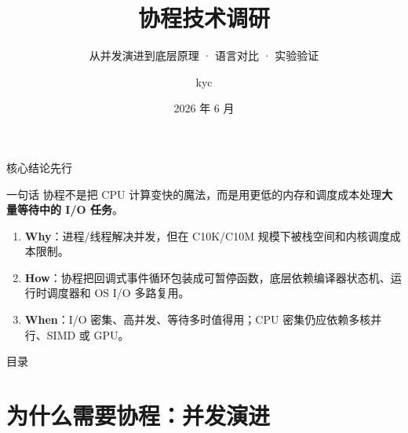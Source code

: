 \documentclass[aspectratio=169, 10pt]{beamer}
\title[协程技术调研]{协程技术调研}
\subtitle{从并发演进到底层原理 · 语言对比 · 实验验证}
\author[kyc]{kyc}
\institute{计算机学院}
\date{2026 年 6 月}
\begin{document}
\begin{frame}
  \titlepage
\end{frame}

\begin{frame}{核心结论先行}
  \begin{block}{一句话}
    协程不是把 CPU 计算变快的魔法，而是用更低的内存和调度成本处理\textbf{大量等待中的 I/O 任务}。
  \end{block}

  \begin{enumerate}
    \item \textbf{Why}：进程/线程解决并发，但在 C10K/C10M 规模下被栈空间和内核调度成本限制。
    \item \textbf{How}：协程把回调式事件循环包装成可暂停函数，底层依赖编译器状态机、运行时调度器和 OS I/O 多路复用。
    \item \textbf{When}：I/O 密集、高并发、等待多时值得用；CPU 密集仍应依赖多核并行、SIMD 或 GPU。
  \end{enumerate}
\end{frame}

\begin{frame}{目录}
  \tableofcontents
\end{frame}

\section{为什么需要协程：并发演进}
\end{document}
